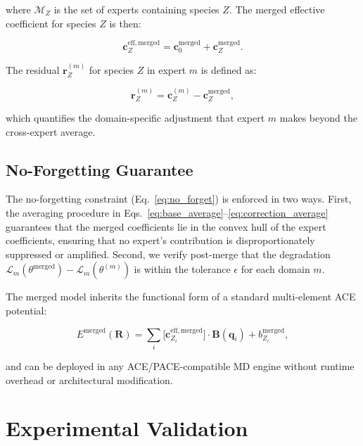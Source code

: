 \documentclass[twoside,prb,aps,floatfix,superscriptaddress,longbibliography]{revtex4-2}
\newcommand{\cZ}{\mathbf{c}_{Z}}
\newcommand{\cb}{\mathbf{c}_{0}}
\begin{document}
where $\mathcal{M}_Z$ is the set of experts containing species $Z$. The merged effective coefficient for species $Z$ is then:

\begin{equation}
\cZ^{\mathrm{eff,merged}} = \cb^{\mathrm{merged}} + \cZ^{\mathrm{merged}}.
\label{eq:merged_effective}
\end{equation}

The residual $\mathbf{r}_Z^{(m)}$ for species $Z$ in expert $m$ is defined as:

\begin{equation}
\mathbf{r}_Z^{(m)} = \cZ^{(m)} - \cZ^{\mathrm{merged}},
\label{eq:residual}
\end{equation}

which quantifies the domain-specific adjustment that expert $m$ makes beyond the cross-expert average.

\subsection{No-Forgetting Guarantee}

The no-forgetting constraint (Eq.~\eqref{eq:no_forget}) is enforced in two ways. First, the averaging procedure in Eqs.~\eqref{eq:base_average}--\eqref{eq:correction_average} guarantees that the merged coefficients lie in the convex hull of the expert coefficients, ensuring that no expert's contribution is disproportionately suppressed or amplified. Second, we verify post-merge that the degradation $\mathcal{L}_m(\theta^{\mathrm{merged}}) - \mathcal{L}_m(\theta^{(m)})$ is within the tolerance $\epsilon$ for each domain $m$.

The merged model inherits the functional form of a standard multi-element ACE potential:

\begin{equation}
E^{\mathrm{merged}}(\mathbf{R}) = \sum_i \big[ \mathbf{c}_{Z_i}^{\mathrm{eff,merged}} \big] \cdot \mathbf{B}(\mathbf{q}_i) + b_{Z_i}^{\mathrm{merged}},
\label{eq:merged_deploy}
\end{equation}

and can be deployed in any ACE/PACE-compatible MD engine without runtime overhead or architectural modification.

\section{Experimental Validation}
\label{sec:results}
\end{document}

